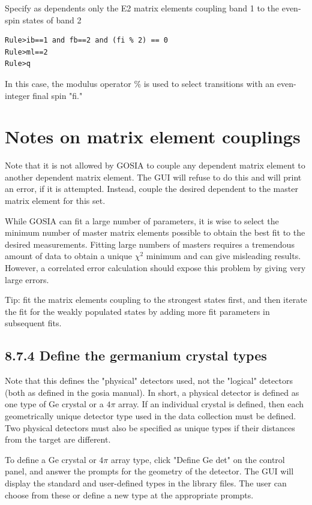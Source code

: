 \documentclass[10pt]{article}
\begin{document}
Specify as dependents only the E2 matrix elements coupling band 1 to the even-spin states of band 2

\begin{verbatim}
Rule>ib==1 and fb==2 and (fi % 2) == 0
Rule>ml==2
Rule>q
\end{verbatim}

In this case, the modulus operator $\%$ is used to select transitions with an even-integer final spin "fi."

\section*{Notes on matrix element couplings}
Note that it is not allowed by GOSIA to couple any dependent matrix element to another dependent matrix element. The GUI will refuse to do this and will print an error, if it is attempted. Instead, couple the desired dependent to the master matrix element for this set.

While GOSIA can fit a large number of parameters, it is wise to select the minimum number of master matrix elements possible to obtain the best fit to the desired measurements. Fitting large numbers of masters requires a tremendous amount of data to obtain a unique $\chi^{2}$ minimum and can give misleading results. However, a correlated error calculation should expose this problem by giving very large errors.

Tip: fit the matrix elements coupling to the strongest states first, and then iterate the fit for the weakly populated states by adding more fit parameters in subsequent fits.

\subsection*{8.7.4 Define the germanium crystal types}
Note that this defines the "physical" detectors used, not the "logical" detectors (both as defined in the gosia manual). In short, a physical detector is defined as one type of Ge crystal or a $4 \pi$ array. If an individual crystal is defined, then each geometrically unique detector type used in the data collection must be defined. Two physical detectors must also be specified as unique types if their distances from the target are different.

To define a Ge crystal or $4 \pi$ array type, click "Define Ge det" on the control panel, and answer the prompts for the geometry of the detector. The GUI will display the standard and user-defined types in the library files. The user can choose from these or define a new type at the appropriate prompts.
\end{document}
